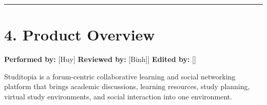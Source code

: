 \documentclass[12pt]{article}
\begin{document}
\endgroup
\par\medskip
\par\noindent\rule{\linewidth}{0.4pt}\par\medskip
\hypertarget{sec:4-product-overview}{}
\section*{4. Product Overview}
\par\medskip
\textbf{\textbf{Performed by:}} [Huy] \textbar{} \textbf{\textbf{Reviewed by:}} [Binh]] \textbar{} \textbf{\textbf{Edited by:}} []
\par\medskip
Studitopia is a forum-centric collaborative learning and social networking platform that brings academic discussions, learning resources, study planning, virtual study environments, and social interaction into one environment.
\par\medskip
\hypertarget{sec:41-product-perspective}{}
\end{document}
